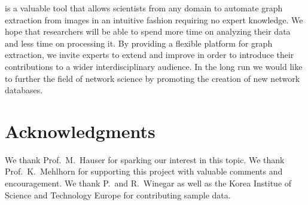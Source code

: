 	\NEFI is a valuable tool that allows scientists from any domain to automate graph extraction from images in an intuitive fashion requiring no expert knowledge. We hope that researchers will be able to spend more time on analyzing their data and less time on processing it. By providing a flexible platform for graph extraction, we invite experts to extend and improve \NEFI in order to introduce their contributions to a wider interdisciplinary audience. In the long run we would like \NEFI to further the field of network science by promoting the creation of new network databases.

\section{Acknowledgments}

	We thank Prof.~M.~Hauser for sparking our interest in this topic. We thank Prof.~K.~Mehlhorn for supporting this project with valuable comments and encouragement. We thank P.~and R.~Winegar as well as the Korea Institue of Science and Technology Europe for contributing sample data.


